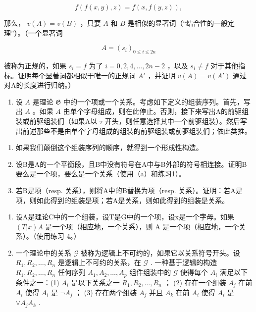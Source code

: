 \[
f (f (x, y), z) = f (x, f (y, z)),
\]

那么， \(v(A) = v(B)\) ，只要 \(A\) 和 \(B\) 是相似的显著词（“结合性的一般定理”）。（一个显著词

\[
A = (s _ {i}) _ {0 \leqslant i \leqslant 2 n}
\]

被称为正规的，如果 \(s_{i}=f\) 为了 \(i=0,2,4,\ldots,2n-2\) ，以及 \(s_{i}\neq f\) 对于其他指标。证明每个显著词都相似于唯一的正规词 \(A'\) ，并证明 \(v(A)=v(A')\) 通过对A的长度进行归纳。）

\begin{enumerate}
\def\labelenumi{\arabic{enumi}.}
\setcounter{enumi}{3}
\tightlist
\item
  设 \(A\) 是理论 \(\mathfrak{G}\) 中的一个项或一个关系。考虑如下定义的组装序列。首先，写出 \(A\) 。如果 \(A\) 由单个字母组成，则在此停止。否则，接下来写出A的前驱组装或前驱组装们（如果A以 \(\tau\) 开头，则任意选择其中一个前驱组装）。然后写出前述那些不是由单个字母组成的组装的前驱组装或前驱组装们；依此类推。
\end{enumerate}

\begin{enumerate}
\def\labelenumi{(\alph{enumi})}
\item
  如果我们颠倒这个组装序列的顺序，就得到一个形成性构造。
\item
  设B是A的一个平衡段，且B中没有符号在A中与B外部的符号相连接。证明B要么是一个项，要么是一个关系（使用（a）和练习1）。
\item
  若B是项（resp. 关系），则将A中的B替换为项（resp. 关系）。证明：若A是项，则如此得到的组装是项；若A是关系，则如此得到的组装是关系。
\end{enumerate}

\begin{enumerate}
\def\labelenumi{\arabic{enumi}.}
\setcounter{enumi}{4}
\item
  设A是理论C中的一个组装，设T是G中的一个项，设x是一个字母。如果 \((T|x)A\) 是一个项（相应地，一个关系），则 A 是一个项（相应地，一个关系）。（使用练习 4。）
\item
  一个理论中的关系 \(\mathcal{G}\) 被称为逻辑上不可约的，如果它以关系符号开头。设 \(R_{1}, R_{2}, \ldots, R_{n}\) 是逻辑上不可约的关系，在 \(\mathcal{G}\) . 一种基于逻辑的构造 \(R_{1}, R_{2}, \ldots, R_{n}\) 任何序列 \(A_{1}, A_{2}, \ldots, A_{p}\) 组件组装中的 \(\mathcal{G}\) 使得每个 \(A_{i}\) 满足以下条件之一：(1) \(A_{i}\) 是以下关系之一 \(R_{1}, R_{2}, \ldots, R_{n}\) ； (2) 存在一个组装 \(A_{j}\) 在前 \(A_{i}\) 使得 \(A_{i}\) 是 \(\neg A_{j}\) ； (3) 存在两个组装 \(A_{j}\) 并且 \(A_{k}\) 在前 \(A_{i}\) 使得 \(A_{i}\) 是 \(\vee A_{j}A_{k}\) .
\end{enumerate}

